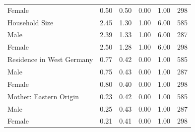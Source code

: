 \documentclass[a4paper, oneside, hyperfootnotes = false]{article}
\begin{document}
{\begin{table}[ht]
\begin{center}
{\begin{tabular}{llllll}
			\multicolumn{1}{l}{\hspace{1em}Female} &
			\multicolumn{1}{r}{0.50} &
			\multicolumn{1}{r}{0.50} &
			\multicolumn{1}{r}{0.00} &
			\multicolumn{1}{r}{1.00} &
			\multicolumn{1}{r}{298} \\
			\multicolumn{1}{l}{Household Size} &
			\multicolumn{1}{r}{2.45} &
			\multicolumn{1}{r}{1.30} &
			\multicolumn{1}{r}{1.00} &
			\multicolumn{1}{r}{6.00} &
			\multicolumn{1}{r}{585} \\
			\multicolumn{1}{l}{\hspace{1em}Male} &
			\multicolumn{1}{r}{2.39} &
			\multicolumn{1}{r}{1.33} &
			\multicolumn{1}{r}{1.00} &
			\multicolumn{1}{r}{6.00} &
			\multicolumn{1}{r}{287} \\
			\multicolumn{1}{l}{\hspace{1em}Female} &
			\multicolumn{1}{r}{2.50} &
			\multicolumn{1}{r}{1.28} &
			\multicolumn{1}{r}{1.00} &
			\multicolumn{1}{r}{6.00} &
			\multicolumn{1}{r}{298} \\
			\multicolumn{1}{l}{Residence in West Germany} &
			\multicolumn{1}{r}{0.77} &
			\multicolumn{1}{r}{0.42} &
			\multicolumn{1}{r}{0.00} &
			\multicolumn{1}{r}{1.00} &
			\multicolumn{1}{r}{585} \\
			\multicolumn{1}{l}{\hspace{1em}Male} &
			\multicolumn{1}{r}{0.75} &
			\multicolumn{1}{r}{0.43} &
			\multicolumn{1}{r}{0.00} &
			\multicolumn{1}{r}{1.00} &
			\multicolumn{1}{r}{287} \\
			\multicolumn{1}{l}{\hspace{1em}Female} &
			\multicolumn{1}{r}{0.80} &
			\multicolumn{1}{r}{0.40} &
			\multicolumn{1}{r}{0.00} &
			\multicolumn{1}{r}{1.00} &
			\multicolumn{1}{r}{298} \\
			\multicolumn{1}{l}{Mother: Eastern Origin} &
			\multicolumn{1}{r}{0.23} &
			\multicolumn{1}{r}{0.42} &
			\multicolumn{1}{r}{0.00} &
			\multicolumn{1}{r}{1.00} &
			\multicolumn{1}{r}{585} \\
			\multicolumn{1}{l}{\hspace{1em}Male} &
			\multicolumn{1}{r}{0.25} &
			\multicolumn{1}{r}{0.43} &
			\multicolumn{1}{r}{0.00} &
			\multicolumn{1}{r}{1.00} &
			\multicolumn{1}{r}{287} \\
			\multicolumn{1}{l}{\hspace{1em}Female} &
			\multicolumn{1}{r}{0.21} &
			\multicolumn{1}{r}{0.41} &
			\multicolumn{1}{r}{0.00} &
			\multicolumn{1}{r}{1.00} &
			\multicolumn{1}{r}{298} \\

\end{tabular}}
\end{center}
\end{table}}
\end{document}
